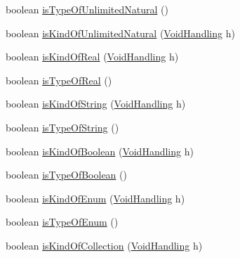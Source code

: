\begin{DoxyCompactItemize}
\item 
boolean \hyperlink{classorg_1_1tzi_1_1use_1_1uml_1_1ocl_1_1type_1_1_type_impl_a639e8ece7d75c6d0e46d862a5cdcbcb2}{is\-Type\-Of\-Unlimited\-Natural} ()
\item 
boolean \hyperlink{classorg_1_1tzi_1_1use_1_1uml_1_1ocl_1_1type_1_1_type_impl_a54fde9e0890f698824d0a8ec1d7241a1}{is\-Kind\-Of\-Unlimited\-Natural} (\hyperlink{enumorg_1_1tzi_1_1use_1_1uml_1_1ocl_1_1type_1_1_type_1_1_void_handling}{Void\-Handling} h)
\item 
boolean \hyperlink{classorg_1_1tzi_1_1use_1_1uml_1_1ocl_1_1type_1_1_type_impl_adf6c9f55c71ea0855c12fbbfd01b8a3f}{is\-Kind\-Of\-Real} (\hyperlink{enumorg_1_1tzi_1_1use_1_1uml_1_1ocl_1_1type_1_1_type_1_1_void_handling}{Void\-Handling} h)
\item 
boolean \hyperlink{classorg_1_1tzi_1_1use_1_1uml_1_1ocl_1_1type_1_1_type_impl_a2d9146c4bcdbc04b35f0f165db498f93}{is\-Type\-Of\-Real} ()
\item 
boolean \hyperlink{classorg_1_1tzi_1_1use_1_1uml_1_1ocl_1_1type_1_1_type_impl_a58d140750704b011d5a97ddd6db62c7b}{is\-Kind\-Of\-String} (\hyperlink{enumorg_1_1tzi_1_1use_1_1uml_1_1ocl_1_1type_1_1_type_1_1_void_handling}{Void\-Handling} h)
\item 
boolean \hyperlink{classorg_1_1tzi_1_1use_1_1uml_1_1ocl_1_1type_1_1_type_impl_a55cc1ec4dbfb07d06ab9ebebe3c7182e}{is\-Type\-Of\-String} ()
\item 
boolean \hyperlink{classorg_1_1tzi_1_1use_1_1uml_1_1ocl_1_1type_1_1_type_impl_a4b08cc77971f2b10893f76505cab964a}{is\-Kind\-Of\-Boolean} (\hyperlink{enumorg_1_1tzi_1_1use_1_1uml_1_1ocl_1_1type_1_1_type_1_1_void_handling}{Void\-Handling} h)
\item 
boolean \hyperlink{classorg_1_1tzi_1_1use_1_1uml_1_1ocl_1_1type_1_1_type_impl_ae8e83decb277c5b93306cc395b431484}{is\-Type\-Of\-Boolean} ()
\item 
boolean \hyperlink{classorg_1_1tzi_1_1use_1_1uml_1_1ocl_1_1type_1_1_type_impl_a1b87d66125d71a8c269d45904dda6169}{is\-Kind\-Of\-Enum} (\hyperlink{enumorg_1_1tzi_1_1use_1_1uml_1_1ocl_1_1type_1_1_type_1_1_void_handling}{Void\-Handling} h)
\item 
boolean \hyperlink{classorg_1_1tzi_1_1use_1_1uml_1_1ocl_1_1type_1_1_type_impl_ac63b7902bea309be628fd293af2e3e0c}{is\-Type\-Of\-Enum} ()
\item 
boolean \hyperlink{classorg_1_1tzi_1_1use_1_1uml_1_1ocl_1_1type_1_1_type_impl_a9f3948034495ccf417e1394ce269aa9d}{is\-Kind\-Of\-Collection} (\hyperlink{enumorg_1_1tzi_1_1use_1_1uml_1_1ocl_1_1type_1_1_type_1_1_void_handling}{Void\-Handling} h)

\end{DoxyCompactItemize}
